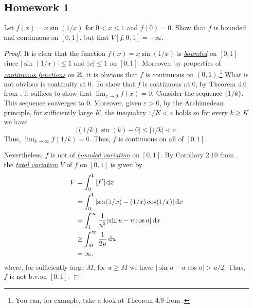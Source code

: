 \subsection{Homework 1}
\begin{problem}
Let $f(x)=x\sin(1/x)$ for $0<x\leq 1$ and $f(0)=0$. Show that $f$ is
bounded and continuous on $[0,1]$, but that $V[f;0,1]=+\infty$.
\end{problem}
\begin{proof}
  It is clear that the function $f(x)=x\sin(1/x)$ is
  \href{https://en.wikipedia.org/wiki/Bounded_function}{\emph{bounded}} on
  $[0,1]$ since $|{\sin(1/x)}|\leq 1$ and $|x|\leq 1$ on $[0,1]$. Moreover,
  by properties of
  \href{https://en.wikipedia.org/wiki/Continuous_function#Weierstrass_definition_.28epsilon.E2.80.93delta.29_of_continuous_functions}{\emph{continuous
      functions}} on $\mathbb{R}$, it is obvious that $f$ is continuous on
  $(0,1)$.\footnote{You can, for example, take a look at Theorem 4.9 from
    \cite[Ch.\@ 4, p.\@ 87]{rudin-1}.} What is not obvious is continuity at
  $0$. To show that $f$ is continuous at $0$, by Theorem 4.6 from
  \cite[Ch.\@ 4, p.\@ 86]{rudin-1}, it suffices to show that
  $\lim_{x\to 0}f(x)=0$. Consider the sequence $\{1/k\}$. This sequence
  converges to $0$. Moreover, given $\varepsilon>0$, by the Archimedean
  principle, for sufficiently large $K$, the inequality $1/K<\varepsilon$
  holds so for every $k\geq K$ we have
\begin{equation}
\label{eq:1:1}
|{(1/k)\sin(k)-0}|\leq
|1/k|<\varepsilon.
\end{equation}
Thus, $\lim_{k\to\infty}f(1/k)=0$. Thus, $f$ is continuous on all of
$[0,1]$.

Nevertheless, $f$ is not of
\href{https://en.wikipedia.org/wiki/Bounded_variation}{\emph{bounded
    variation}} on $[0,1]$. By Corollary 2.10 from \cite[Ch.\@ 2, p.\@
23]{wheeden-zygmund}, the
\href{https://en.wikipedia.org/wiki/Total_variation}{\emph{total
    variation}} $V$ of $f$ on $[0,1]$ is given by
\begin{equation}
\label{eq:1:2}
\begin{aligned}
V&=\int_0^1|f'|\mathop{}\!\mathrm{d} x\\
&=\int_0^1|{\sin(1/x)-(1/x)\cos(1/x)}|\mathop{}\!\mathrm{d} x\\
&=\int_1^\infty\frac{1}{u^2}|{\sin u-u\cos u}|\mathop{}\!\mathrm{d} x\\
&\geq\int_M^\infty \frac{1}{2u}\mathop{}\!\mathrm{d} u\\
&=\infty,
\end{aligned}
\end{equation}
where, for sufficiently large $M$, for $u\geq M$ we have $|{\sin u- u\cos
  u}|>u/2$. Thus, $f$ is not b.v.\@ on $[0,1]$.
\end{proof}

